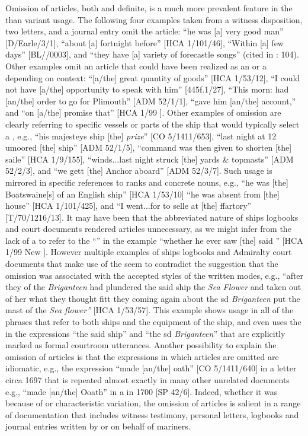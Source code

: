 Omission of articles, both  and definite, is a much more prevalent feature in the  than variant usage. The following four examples taken from a witness disposition, two letters, and a journal entry omit the  article: “he was [a] very good man” [D/Earle/3/1], “about [a] fortnight before” [HCA 1/101/46], “Within [a] few days” [BL/\citealt{Egerton2395}/0003], and “they have [a] variety of forecastle songs” (cited in \citealt{Palmer1986}: 104). Other examples omit an article that could have been realized as an  or a  depending on context: “[a/the] great quantity of goods” [HCA 1/53/12], “I could not have [a/the] opportunity to speak with him” [445f.1/27], “This morn: had [an/the] order to go for Plimouth” [ADM 52/1/1], “gave him [an/the] account,” and “on [a/the] promise that” [HCA 1/99  \citealt{Islands1722}]. Other examples of omission are clearly referring to specific vessels or parts of the ship that would typically select a , e.g., “his majesteys ship [the] \textit{ prize}” [CO 5/1411/653], “last night at 12 umoored [the] ship” [ADM 52/1/5], “command was then given to shorten [the] saile” [HCA 1/9/155], “winds...last night struck [the] yards \& topmasts” [ADM 52/2/3], and “we gett [the] Anchor aboard” [ADM 52/3/7]. Such usage is mirrored in specific references to ranks and concrete nouns, e.g., “he was [the] Boatswaine[s]  of an English ship” [HCA 1/53/10] “he was absent from [the] house” [HCA 1/101/425], and “I went...for to selle at [the] ffartory” [T/70/1216/13]. It may have been that the abbreviated nature of ships logbooks and court documents rendered articles unnecessary, as we might infer from the lack of a  to refer to the “” in the example “whether he ever saw [the] said ” [HCA 1/99 New \citealt{Providence1722}]. However multiple examples of ships logbooks and Admiralty court documents that make use of the  seem to contradict the suggestion that the omission was associated with the accepted styles of the written modes, e.g., “after they of the \textit{Briganteen} had plundered the said ship the \textit{Sea Flower} and taken out of her what they thought fitt they coming again about the sd \textit{Briganteen} put the mast of the \textit{Sea flower”} [HCA 1/53/57]. This example shows  usage in all of the phrases that refer to both ships and the equipment of the ship, and even uses the  in the expressions “the said ship” and “the sd \textit{Briganteen}” that are explicitly marked as formal courtroom utterances. Another possibility to explain the omission of articles is that the expressions in which articles are omitted are idiomatic, e.g., the expression “made [an/the] oath” [CO 5/1411/640] in a letter circa 1697 that is repeated almost exactly in many other unrelated documents e.g., “made [an/the] Ooath” in a  in 1700 [SP 42/6]. Indeed, whether it was because of  or characteristic variation, the omission of articles is salient in a range of documentation that includes witness testimony, personal letters, logbooks and journal entries written by or on behalf of mariners. 

